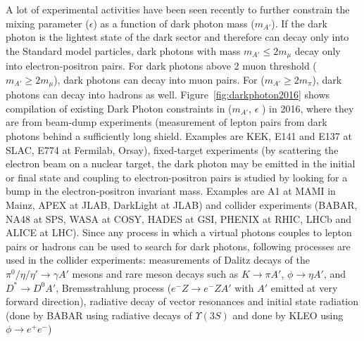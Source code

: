 \documentclass[../report.tex]{subfiles}
\begin{document}


A lot of experimental activities have been seen recently to further constrain 
the mixing parameter ($\epsilon$) as a function of dark photon mass ($m_{A'}$).
If the dark photon is the lightest state of the dark sector 
and therefore can decay only into the Standard model particles, dark photons with
mass $m_{A'} \le 2m_{\mu}$ decay only into electron-positron pairs. 
For dark photons above 2 muon threshold ($m_{A'} \ge 2m_{\mu}$), 
dark photons can decay into muon pairs. For ($m_{A'} \ge 2m_{\pi}$), 
dark photons can decay into hadrons as well. 
Figure~\ref{fig:darkphoton2016} shows compilation of existing Dark Photon constraints in ($m_{A'}$, $\epsilon$ ) in 2016, where they are from 
beam-dump experiments (measurement of lepton pairs from dark photons 
behind a sufficiently long shield. Examples are 
KEK, E141 and E137 at SLAC, E774 at Fermilab, Orsay), 
fixed-target experiments (by scattering the electron beam on a nuclear target, 
the dark photon may be emitted in the initial or final state and coupling to 
electron-positron pairs is studied by looking for a bump in the 
electron-positron invariant mass. Examples are A1 at MAMI in Mainz, 
APEX at JLAB, DarkLight at JLAB)
and collider experiments (BABAR, NA48 at SPS, WASA at COSY, HADES at GSI, 
PHENIX at RHIC, LHCb and ALICE at LHC).
Since any process in which a virtual photons couples to lepton pairs or hadrons 
can be used to search for dark photons, following processes are used in the collider experiments: measurements of Dalitz decays of the $\pi^0/\eta/\eta' \rightarrow \gamma A'$ mesons and rare meson decays such as $K\rightarrow \pi A'$, $\phi \rightarrow \eta A'$, 
and $D^{*} \rightarrow D^{0}A'$,
Bremsstrahlung process 
($e^{-}Z \rightarrow e^{-}ZA'$ with $A'$ emitted at very forward direction),  
radiative decay of vector resonances and initial state radiation 
(done by BABAR using radiative decays of $\Upsilon(3S)$ and 
done by KLEO using $\phi \rightarrow e^+e^-$)
\end{document}

